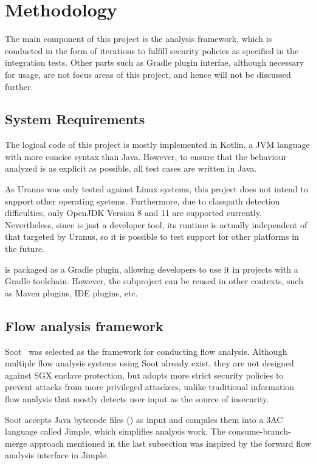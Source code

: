 \section{Methodology}\label{sec:methodology}
The main component of this project is the analysis framework,
which is conducted in the form of iterations
to fulfill security policies as specified in the integration tests.
Other parts such as Gradle plugin interfae,
although necessary for usage,
are not focus areas of this project, and hence will not be discussed further.



\subsection{System Requirements}\label{subsec:system-requirements}
The logical code of this project is mostly implemented in Kotlin,
a \ac{JVM} language with more concise syntax than Java.
However, to ensure that the behaviour analyzed
is as explicit as possible,
all test cases are written in Java.

As Uranus was only tested against Linux systems,
this project does not intend to support other operating systems.
Furthermore, due to classpath detection difficulties,
only OpenJDK Version 8 and 11 are supported currently.
Nevertheless, since \pname{} is just a developer tool,
its runtime is actually independent of that targeted by Uranus,
so it is possible to test support for other platforms in the future.

\pname{} is packaged as a Gradle plugin,
allowing developers to use it in projects with a Gradle toolchain.
However, the  subproject can be reused in other contexts,
such as Maven plugins, IDE plugins, etc.

\subsection{Flow analysis framework}\label{subsec:flow-analysis-framework}
Soot~\cite{sootsurvivor} was selected as the framework for conducting flow analysis.
Although multiple flow analysis systems using Soot already exist,
they are not designed against \ac{SGX} enclave protection,
but \pname{} adopts more strict security policies
to prevent attacks from more privileged attackers,
unlike traditional information flow analysis
that mostly detects user input as the source of insecurity.

Soot accepts Java bytecode files () as input
and compiles them into a \ac{3AC} language called Jimple,
which simplifies analysis work.
The consume-branch-merge approach mentioned in the last subsection
was inspired by the forward flow analysis interface in Jimple.

